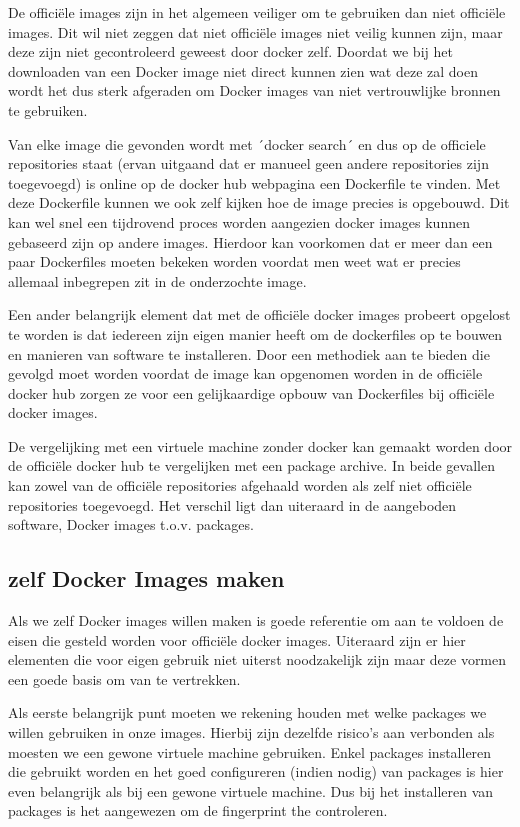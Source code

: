 De officiële images zijn in het algemeen veiliger om te gebruiken dan niet officiële images. Dit wil niet zeggen dat niet officiële images niet veilig kunnen zijn, maar deze zijn niet gecontroleerd geweest door docker zelf. Doordat we bij het downloaden van een Docker image niet direct kunnen zien wat deze zal doen wordt het dus sterk afgeraden om Docker images van niet vertrouwlijke bronnen te gebruiken.

Van elke image die gevonden wordt met ´docker search´ en dus op de officiele repositories staat (ervan uitgaand dat er manueel geen andere repositories zijn toegevoegd) is online op de docker hub webpagina een Dockerfile te vinden. Met deze Dockerfile kunnen we ook zelf kijken hoe de image precies is opgebouwd. Dit kan wel snel een tijdrovend proces worden aangezien docker images kunnen gebaseerd zijn op andere images. Hierdoor kan voorkomen dat er meer dan een paar Dockerfiles moeten bekeken worden voordat men weet wat er precies allemaal inbegrepen zit in de onderzochte image.

Een ander belangrijk element dat met de officiële docker images probeert opgelost te worden is dat iedereen zijn eigen manier heeft om de dockerfiles op te bouwen en manieren van software te installeren. Door een methodiek aan te bieden die gevolgd moet worden voordat de image kan opgenomen worden in de officiële docker hub zorgen ze voor een gelijkaardige opbouw van Dockerfiles bij officiële docker images.


De vergelijking met een virtuele machine zonder docker kan gemaakt worden door de officiële docker hub te vergelijken met een package archive. In beide gevallen kan zowel van de officiële repositories afgehaald worden als zelf niet officiële repositories toegevoegd. Het verschil ligt dan uiteraard in de aangeboden software, Docker images t.o.v. packages. 

\subsection{zelf Docker Images maken}

Als we zelf Docker images willen maken is goede referentie om aan te voldoen de eisen die gesteld worden voor officiële docker images. Uiteraard zijn er hier elementen die voor eigen gebruik niet uiterst noodzakelijk zijn maar deze vormen een goede basis om van te vertrekken.

Als eerste belangrijk punt moeten we rekening houden met welke packages we willen gebruiken in onze images. Hierbij zijn dezelfde risico's aan verbonden als moesten we een gewone virtuele machine gebruiken. Enkel packages installeren die gebruikt worden en het goed configureren (indien nodig) van packages is hier even belangrijk als bij een gewone virtuele machine. Dus bij het installeren van packages is het aangewezen om de fingerprint the controleren. 

